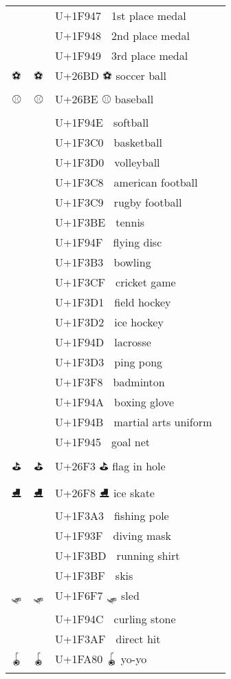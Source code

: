 \documentclass[a4paper,12pt]{article}
\newcommand{\fontA}[1]{{\fontspec[RawFeature={mode=harf,+dist,+ccmp}]{Segoe UI Emoji} #1}}
\newcommand{\fontB}[1]{{\fontspec[RawFeature={mode=harf,+dist,+ccmp}]{Noto Color Emoji} #1}}
\begin{document}
\begin{longtable}[c]{ccp{0.8\linewidth}}
\fontA{🥇}&\fontB{🥇}&U+1F947 🥇 1st place medal\\
\fontA{🥈}&\fontB{🥈}&U+1F948 🥈 2nd place medal\\
\fontA{🥉}&\fontB{🥉}&U+1F949 🥉 3rd place medal\\
\fontA{⚽}&\fontB{⚽}&U+26BD ⚽ soccer ball\\
\fontA{⚾}&\fontB{⚾}&U+26BE ⚾ baseball\\
\fontA{🥎}&\fontB{🥎}&U+1F94E 🥎 softball\\
\fontA{🏀}&\fontB{🏀}&U+1F3C0 🏀 basketball\\
\fontA{🏐}&\fontB{🏐}&U+1F3D0 🏐 volleyball\\
\fontA{🏈}&\fontB{🏈}&U+1F3C8 🏈 american football\\
\fontA{🏉}&\fontB{🏉}&U+1F3C9 🏉 rugby football\\
\fontA{🎾}&\fontB{🎾}&U+1F3BE 🎾 tennis\\
\fontA{🥏}&\fontB{🥏}&U+1F94F 🥏 flying disc\\
\fontA{🎳}&\fontB{🎳}&U+1F3B3 🎳 bowling\\
\fontA{🏏}&\fontB{🏏}&U+1F3CF 🏏 cricket game\\
\fontA{🏑}&\fontB{🏑}&U+1F3D1 🏑 field hockey\\
\fontA{🏒}&\fontB{🏒}&U+1F3D2 🏒 ice hockey\\
\fontA{🥍}&\fontB{🥍}&U+1F94D 🥍 lacrosse\\
\fontA{🏓}&\fontB{🏓}&U+1F3D3 🏓 ping pong\\
\fontA{🏸}&\fontB{🏸}&U+1F3F8 🏸 badminton\\
\fontA{🥊}&\fontB{🥊}&U+1F94A 🥊 boxing glove\\
\fontA{🥋}&\fontB{🥋}&U+1F94B 🥋 martial arts uniform\\
\fontA{🥅}&\fontB{🥅}&U+1F945 🥅 goal net\\
\fontA{⛳}&\fontB{⛳}&U+26F3 ⛳ flag in hole\\
\fontA{⛸}&\fontB{⛸}&U+26F8 ⛸ ice skate\\
\fontA{🎣}&\fontB{🎣}&U+1F3A3 🎣 fishing pole\\
\fontA{🤿}&\fontB{🤿}&U+1F93F 🤿 diving mask\\
\fontA{🎽}&\fontB{🎽}&U+1F3BD 🎽 running shirt\\
\fontA{🎿}&\fontB{🎿}&U+1F3BF 🎿 skis\\
\fontA{🛷}&\fontB{🛷}&U+1F6F7 🛷 sled\\
\fontA{🥌}&\fontB{🥌}&U+1F94C 🥌 curling stone\\
\fontA{🎯}&\fontB{🎯}&U+1F3AF 🎯 direct hit\\
\fontA{🪀}&\fontB{🪀}&U+1FA80 🪀 yo-yo\\

\end{longtable}
\end{document}
